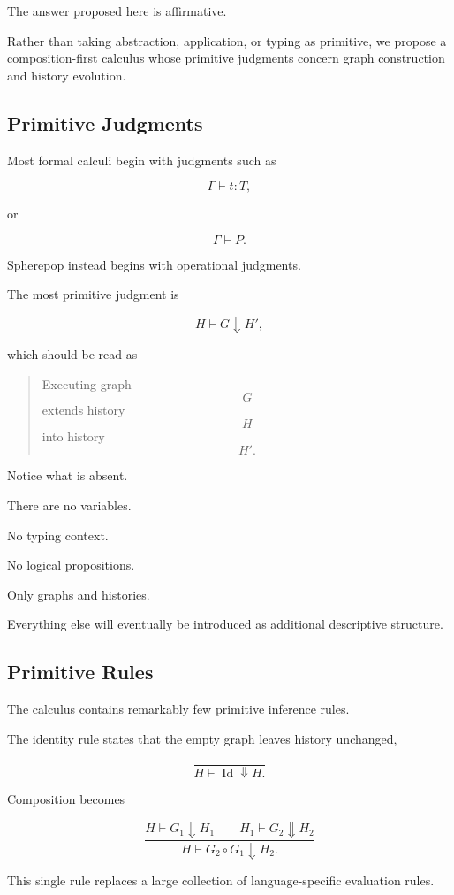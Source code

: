 \documentclass[12pt,oneside]{article}
\begin{document}
The answer proposed here is affirmative.

Rather than taking abstraction, application, or typing as primitive, we propose a composition-first calculus whose primitive judgments concern graph construction and history evolution.

\subsection{Primitive Judgments}

Most formal calculi begin with judgments such as

\[
\Gamma \vdash t : T,
\]

or

\[
\Gamma \vdash P.
\]

Spherepop instead begins with operational judgments.

The most primitive judgment is

\[
H
\vdash
G
\Downarrow
H',
\]

which should be read as

\begin{quote}
Executing graph
\[
G
\]
extends history
\[
H
\]
into history
\[
H'.
\]
\end{quote}

Notice what is absent.

There are no variables.

No typing context.

No logical propositions.

Only graphs and histories.

Everything else will eventually be introduced as additional descriptive structure.

\subsection{Primitive Rules}

The calculus contains remarkably few primitive inference rules.

The identity rule states that the empty graph leaves history unchanged,

\[
\frac{\ }
{H
\vdash
\operatorname{Id}
\Downarrow
H.}
\]

Composition becomes

\[
\frac{
H
\vdash
G_1
\Downarrow
H_1
\qquad
H_1
\vdash
G_2
\Downarrow
H_2
}
{
H
\vdash
G_2\circ G_1
\Downarrow
H_2.
}
\]

This single rule replaces a large collection of language-specific evaluation rules.
\end{document}
